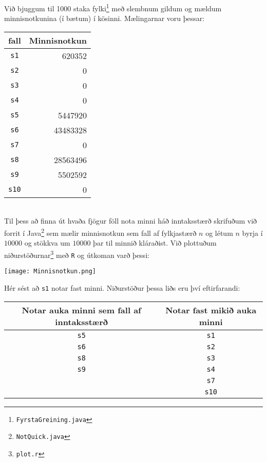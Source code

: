 \documentclass[a4paper,oneside]{article}
\begin{document}
\noindent Við bjuggum til 1000 staka fylki\footnote{\texttt{FyrstaGreining.java}} með slembnum gildum og mældum minnisnotkunina (í bætum) í kösinni. Mælingarnar voru þessar: \\ 

\begin{tabular}{ c | r }
    fall         & Minnisnotkun \\ \hline
    \texttt{s1}  &       620352 \\
    \texttt{s2}  &            0 \\
    \texttt{s3}  &            0 \\
    \texttt{s4}  &            0 \\
    \texttt{s5}  &      5447920 \\
    \texttt{s6}  &     43483328 \\
    \texttt{s7}  &            0 \\
    \texttt{s8}  &     28563496 \\
    \texttt{s9}  &      5502592 \\
    \texttt{s10} &            0 \\
\end{tabular} \\

\noindent Til þess að finna út hvaða fjögur föll nota minni háð inntaksstærð skrifuðum við forrit í Java\footnote{\texttt{NotQuick.java}} sem mælir minnisnotkun sem fall af fylkjastærð $n$ og létum $n$ byrja í $10000$ og stökkva um $10000$ þar til minnið kláraðist. Við plottuðum niðurstöðurnar\footnote{\texttt{plot.r}} með \texttt{R} og útkoman varð þessi: \\

\centerline{\texttt{[image: Minnisnotkun.png]}}

Hér sést að \texttt{s1} notar fast minni. Niðurstöður þessa liðs eru því eftirfarandi: \\

\begin{tabular}{ c | c }
    Notar auka minni sem fall af inntaksstærð & Notar fast mikið auka minni \\ \hline
    \texttt{s5} &  \texttt{s1} \\
    \texttt{s6} &  \texttt{s2} \\
    \texttt{s8} &  \texttt{s3} \\
    \texttt{s9} &  \texttt{s4} \\
                &  \texttt{s7} \\
                & \texttt{s10} \\ 
\end{tabular}
\end{document}
